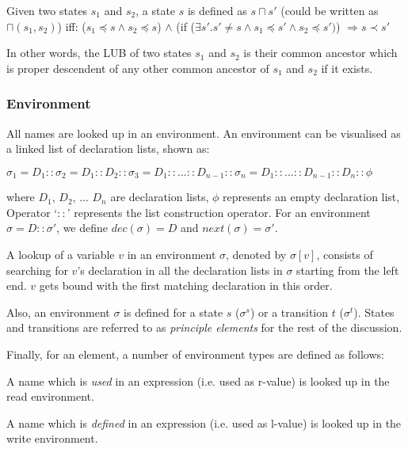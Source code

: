 \documentclass[12pt,a4paper]{report}
\begin{document}
\begin{definition} \label{d:lub}
	Given two states $s_1$ and $s_2$, a state $s$ is defined as $s \sqcap s'$ (could be written as $\sqcap(s_1, s_2)$) iff: ($s_1 \preceq s \wedge s_2 \preceq s$) $\wedge$ (if ($\exists s' . s' \neq s \wedge s_1 \preceq s' \wedge s_2 \preceq s')$) $\Rightarrow s \prec s'$ 
\end{definition}

In other words, the LUB of two states $s_1$ and $s_2$ is their common ancestor which is proper descendent of any other common ancestor of $s_1$ and $s_2$ if it exists.

\subsubsection{Environment}
All names are looked up in an environment. An environment can be visualised as a linked list of declaration lists, shown as:

$\sigma_1 = D_1 :: \sigma_2 = D_1 :: D_2 :: \sigma_3 = D_1 :: ... :: D_{n-1} :: \sigma_n  = D_1 :: ... :: D_{n-1} :: D_n :: \phi $

where $D_1$, $D_2$, ... $D_n$ are declaration lists, $\phi$ represents an empty declaration list, Operator `$::$' represents the list construction operator. For an environment $\sigma = D :: \sigma'$, we define $dec(\sigma) = D$ and $next(\sigma) = \sigma'$.

A lookup of a variable $v$ in an environment $\sigma$, denoted by $\sigma[v]$, consists of searching for $v$'s declaration in all the declaration lists in $\sigma$ starting from the left end. $v$ gets bound with the first matching declaration in this order.

Also, an environment $\sigma$ is defined for a state $s$ ($\sigma^s$) or a transition $t$ ($\sigma^t$). States and transitions are referred to as \emph{principle elements} for the rest of the discussion.

Finally, for an element, a number of environment types are defined as follows:

\begin{definition}
	A name which is \emph{used} in an expression (i.e. used as r-value) is looked up in the read environment. 
\end{definition}

\begin{definition}
	A name which is \emph{defined} in an expression (i.e. used as l-value) is looked up in the write environment. 
\end{definition}
\end{document}
